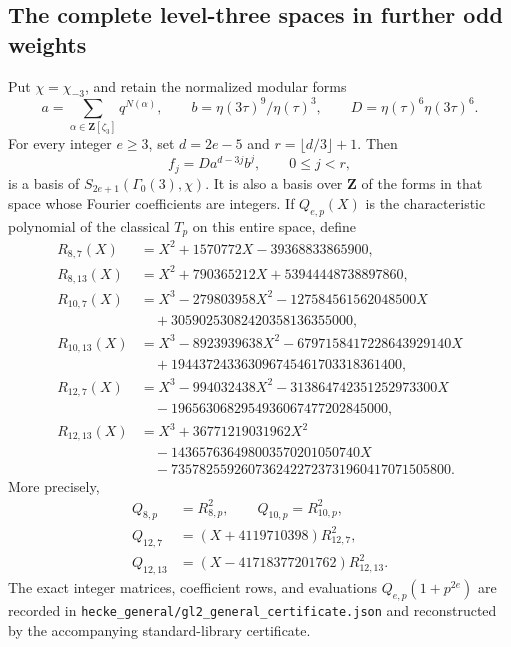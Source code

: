 \subsection{The complete level-three spaces in further odd weights}
\label{sec:gl2-general-model}

\begin{proposition}[K17-GL2-GENERAL]\label{prop:gl2-general}
Put $\chi=\chi_{-3}$, and retain the normalized modular forms
\[
 a=\sum_{\alpha\in\mathbf Z[\zeta_3]}q^{N(\alpha)},\qquad
 b=\eta(3\tau)^9/\eta(\tau)^3,\qquad
 D=\eta(\tau)^6\eta(3\tau)^6.
\]
For every integer $e\ge3$, set $d=2e-5$ and $r=\lfloor d/3\rfloor+1$.
Then
\[
 f_j=Da^{d-3j}b^j,\qquad 0\le j<r,
 \tag{G1}
\]
is a basis of $S_{2e+1}(\Gamma_0(3),\chi)$. It is also a basis over
$\mathbf Z$ of the forms in that space whose Fourier coefficients are
integers. If $Q_{e,p}(X)$ is the characteristic polynomial of the
classical $T_p$ on this entire space, define
\begin{align*}
R_{8,7}(X)&=X^2+1570772X-39368833865900,\\
R_{8,13}(X)&=X^2+790365212X+53944448738897860,\\
R_{10,7}(X)&=X^3-279803958X^2-127584561562048500X\\
&\quad+30590253082420358136355000,\\
R_{10,13}(X)&=X^3-8923939638X^2-6797158417228643929140X\\
&\quad+194437243363096745461703318361400,\\
R_{12,7}(X)&=X^3-994032438X^2-313864742351252973300X\\
&\quad-1965630682954936067477202845000,\\
R_{12,13}(X)&=X^3+36771219031962X^2\\
&\quad-143657636498003570201050740X\\
&\quad-7357825592607362422723731960417071505800.
\end{align*}
More precisely,
\[
\begin{split}
 Q_{8,p}&=R_{8,p}^2,\qquad Q_{10,p}=R_{10,p}^2,\\
 Q_{12,7}&=(X+4119710398)R_{12,7}^2,\\
 Q_{12,13}&=(X-41718377201762)R_{12,13}^2.
\end{split}
\tag{G2}
\]
The exact integer matrices, coefficient rows, and evaluations
$Q_{e,p}(1+p^{2e})$ are recorded in
\texttt{hecke\_general/gl2\_general\_certificate.json} and reconstructed by
the accompanying standard-library certificate.
\end{proposition}

